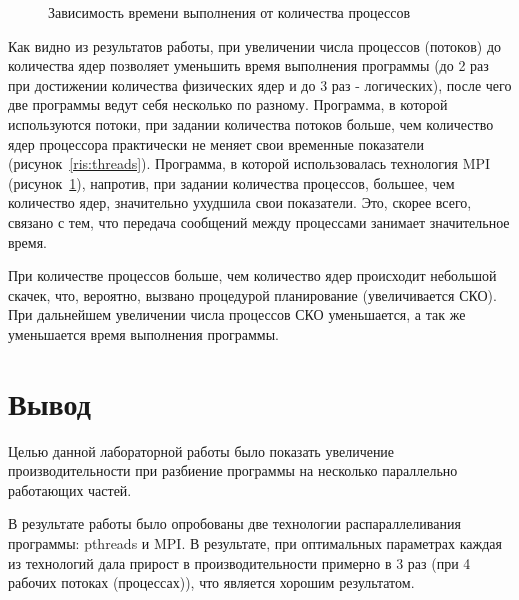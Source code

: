 \documentclass[12pt,a4paper]{report}
\begin{document}
				\begin{figure}[h]
					\caption{Зависимость времени выполнения от количества процессов}
					\label{ris:mpi}
				\end{figure}
				
				Как видно из результатов работы, при увеличении числа процессов 
				(потоков) до количества ядер позволяет уменьшить время выполнения программы (до 2 раз при достижении количества физических ядер и до 3 раз - логических), после чего две программы ведут себя несколько по разному. Программа, в которой используются потоки, 
				при задании количества потоков больше, чем количество ядер процессора 
				практически не меняет свои временные показатели (рисунок~\ref{ris:threads}). Программа, в которой использовалась технология MPI (рисунок~\ref{ris:mpi}), напротив, при задании количества процессов, большее, чем количество ядер, значительно ухудшила 
				свои показатели. Это, скорее всего, связано с тем, что передача 
				сообщений между процессами занимает значительное время.
				
				При количестве процессов больше, чем количество ядер происходит небольшой 
				скачек, что, вероятно, вызвано процедурой планирование (увеличивается СКО).
				При дальнейшем увеличении числа процессов СКО уменьшается, а так же уменьшается время выполнения программы.
				
			\section{Вывод}
			
				Целью данной лабораторной работы было показать увеличение 
				производительности при разбиение программы на несколько параллельно 
				работающих частей.
				
				В результате работы было опробованы две технологии распараллеливания 
				программы: pthreads и MPI. В результате, при оптимальных параметрах 
				каждая из технологий дала прирост в производительности примерно в 3 
				раз (при 4 рабочих потоках (процессах)), что является хорошим 
				результатом.
				
\end{document}
